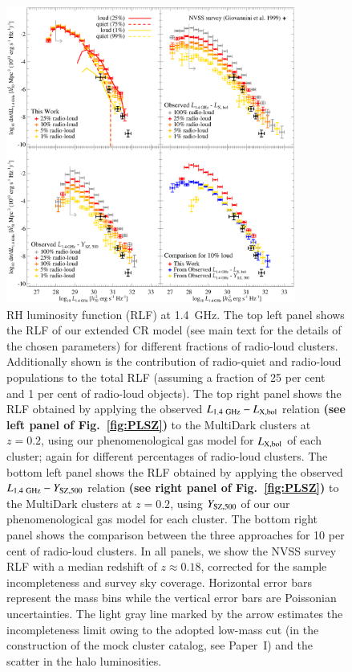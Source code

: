 \documentclass[useAMS,usenatbib]{mn2e}
\begin{document}
\begin{figure} 
\centering
\includegraphics[width=0.85\textwidth]{figures/RLFs_1.4.eps}
\caption{RH luminosity function (RLF) at 1.4~GHz. The top left panel shows the
  RLF of our extended CR model (see main text for the details of the chosen
  parameters) for different fractions of radio-loud clusters. Additionally shown
  is the contribution of radio-quiet and radio-loud populations to the total RLF
  (assuming a fraction of 25 per cent and 1 per cent of radio-loud objects). The
  top right panel shows the RLF obtained by applying the observed
  $L_{1.4~{\mathrm{GHz}}}-L_{{\mathrm{X,bol}}}$ relation {\bf (see left panel of
    Fig.~\ref{fig:PLSZ})} to the MultiDark clusters at $z = 0.2$, using our
  phenomenological gas model for $L_{{\mathrm{X,bol}}}$ of each cluster; again for
  different percentages of radio-loud clusters.  The bottom left panel shows the
  RLF obtained by applying the observed $L_{1.4~{\mathrm{GHz}}}-Y_{{\mathrm{SZ}}, 500}$
  relation {\bf (see right panel of Fig.~\ref{fig:PLSZ})} to the MultiDark
  clusters at $z = 0.2$, using $Y_{{\mathrm{SZ}}, 500}$ of our our phenomenological
  gas model for each cluster. The bottom right panel shows the comparison
  between the three approaches for 10 per cent of radio-loud clusters. In all
  panels, we show the NVSS survey RLF \citep{1999NewA....4..141G} with a median
  redshift of $z\approx 0.18$, corrected for the sample incompleteness and
  survey sky coverage.  Horizontal error bars represent the mass bins while the
  vertical error bars are Poissonian uncertainties. The light gray line marked
  by the arrow estimates the incompleteness limit owing to the adopted low-mass
  cut (in the construction of the mock cluster catalog, see Paper~I) and the
  scatter in the halo luminosities.}
\label{fig:RLF_1.4}
\end{figure}
\end{document}
